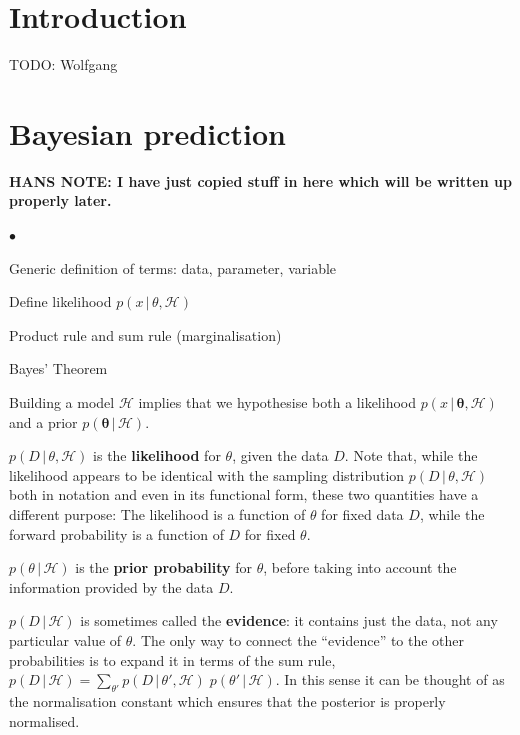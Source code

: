 \documentclass[11pt]{article}
\newenvironment{mtemize}{
  \begin{list}{$\bullet$}
    {\setlength{\itemsep}{0pt}
     \setlength{\leftmargin}{3ex}
    }
  }
  {\end{list}}
\newcommand{\hmod}  {{\mathcal{H}}}  %
\newcommand{\cond}{\,|\,}
\newcommand{\bmtheta}{{\bm{\theta}}}
\begin{document}
\section{Introduction}

TODO: Wolfgang

\section{Bayesian prediction}

\textbf{HANS NOTE: I have just copied stuff in here which will be
  written up properly later.}
\begin{mtemize}
\item Generic definition of terms: data, parameter, variable
\item Define likelihood $p(x\cond\theta,\hmod)$
\item Product rule and sum rule (marginalisation)
\item Bayes' Theorem

\item Building a model $\hmod$ implies that we hypothesise both a
  likelihood $p(x\cond\bmtheta,\hmod)$ and a prior
  $p(\bmtheta\cond\hmod)$.

\item $p(D\cond\theta,\hmod)$ is the \textbf{likelihood} for $\theta$,
  given the data $D$. Note that, while the likelihood appears to be
  identical with the sampling distribution $p(D\cond\theta,\hmod)$
  both in notation and even in its functional form, these two
  quantities have a different purpose: The likelihood is a function of
  $\theta$ for fixed data $D$, while the forward probability is a
  function of $D$ for fixed $\theta$.

\item $p(\theta\cond\hmod)$ is the \textbf{prior probability} for
  $\theta$, before taking into account the information provided by the
  data $D$.

\item $p(D\cond\hmod)$ is sometimes called the \textbf{evidence}: it
  contains just the data, not any particular value of $\theta$. The
  only way to connect the ``evidence'' to the other probabilities is
  to expand it in terms of the sum rule, $p(D\cond\hmod) =
  \sum_{\theta'} p(D\cond\theta',\hmod)\;p(\theta'\cond\hmod)$. In
  this sense it can be thought of as the normalisation constant which
  ensures that the posterior is properly normalised.



\end{mtemize}
\end{document}

